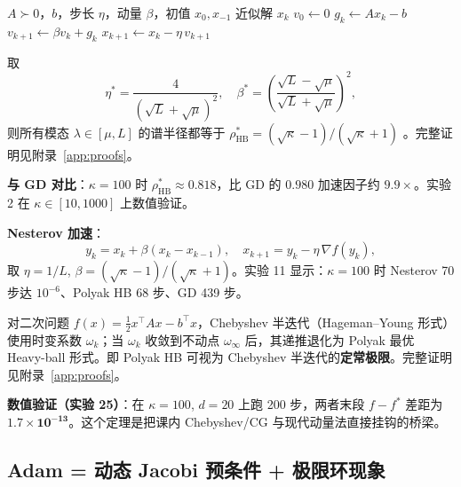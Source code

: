 \begin{algorithm}[htbp]
  \caption{Polyak Heavy-ball 方法}
  \label{alg:hb}
  \begin{algorithmic}[1]
    \Require $A\succ 0$，$b$，步长 $\eta$，动量 $\beta$，初值 $x_0,x_{-1}$
    \Ensure 近似解 $x_k$
    \State $v_0 \gets 0$
      \State $g_k \gets A x_k - b$
      \State $v_{k+1} \gets \beta v_k + g_k$
      \State $x_{k+1} \gets x_k - \eta\, v_{k+1}$
    \EndFor
  \end{algorithmic}
\end{algorithm}

\begin{theorem}
\label{thm:hb}
取
\[
  \eta^* = \frac{4}{(\sqrt{L}+\sqrt{\mu})^2},\quad \beta^* = \left(\frac{\sqrt{L}-\sqrt{\mu}}{\sqrt{L}+\sqrt{\mu}}\right)^2,
\]
则所有模态 $\lambda \in [\mu, L]$ 的谱半径都等于 $\rho^*_{\mathrm{HB}} = (\sqrt{\kappa}-1)/(\sqrt{\kappa}+1)$ \cite{polyak1964}。完整证明见附录~\ref{app:proofs}。
\end{theorem}

\textbf{与 GD 对比}：$\kappa = 100$ 时 $\rho^*_{\mathrm{HB}} \approx 0.818$，比 GD 的 $0.980$ 加速因子约 $9.9\times$。实验 2 在 $\kappa \in [10, 1000]$ 上数值验证。

\textbf{Nesterov 加速}：
\[
  y_k = x_k + \beta(x_k - x_{k-1}),\quad x_{k+1} = y_k - \eta\,\nabla f(y_k),
\]
取 $\eta = 1/L$, $\beta = (\sqrt{\kappa}-1)/(\sqrt{\kappa}+1)$。实验 11 显示：$\kappa = 100$ 时 Nesterov 70 步达 $10^{-6}$、Polyak HB 68 步、GD 439 步。

\begin{theorem}
\label{thm:hb-cheb}
对二次问题 $f(x) = \tfrac{1}{2} x^\top A x - b^\top x$，Chebyshev 半迭代（Hageman--Young 形式）使用时变系数 $\omega_k$；当 $\omega_k$ 收敛到不动点 $\omega_\infty$ 后，其递推退化为 Polyak 最优 Heavy-ball 形式。即 Polyak HB 可视为 Chebyshev 半迭代的\textbf{定常极限}。完整证明见附录~\ref{app:proofs}。
\end{theorem}

\textbf{数值验证（实验 25）}：在 $\kappa = 100$, $d = 20$ 上跑 200 步，两者末段 $f - f^*$ 差距为 $\mathbf{1.7 \times 10^{-13}}$。这个定理是把课内 Chebyshev/CG 与现代动量法直接挂钩的桥梁。

\subsection{Adam = 动态 Jacobi 预条件 + 极限环现象}

